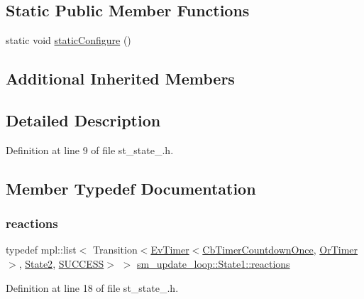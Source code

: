 \subsection*{Static Public Member Functions}
\begin{DoxyCompactItemize}
\item 
static void \hyperlink{structsm__update__loop_1_1State1_a54b1ae508eb3d814fb2d811d78298b0e}{static\+Configure} ()
\end{DoxyCompactItemize}
\subsection*{Additional Inherited Members}


\subsection{Detailed Description}


Definition at line 9 of file st\+\_\+state\+\_.\+h.



\subsection{Member Typedef Documentation}
\mbox{\label{structsm__update__loop_1_1State1_a828232579aa51d4fbfe9858c2a7016ad}} 
\subsubsection{\texorpdfstring{reactions}{reactions}}
{\footnotesize\ttfamily typedef mpl\+::list$<$ Transition$<$\hyperlink{structcl__ros__timer_1_1EvTimer}{Ev\+Timer}$<$\hyperlink{classcl__ros__timer_1_1CbTimerCountdownOnce}{Cb\+Timer\+Countdown\+Once}, \hyperlink{classsm__update__loop_1_1OrTimer}{Or\+Timer}$>$, \hyperlink{structsm__update__loop_1_1State2}{State2}, \hyperlink{structsmacc_1_1default__transition__tags_1_1SUCCESS}{S\+U\+C\+C\+E\+SS}$>$ $>$ \hyperlink{structsm__update__loop_1_1State1_a828232579aa51d4fbfe9858c2a7016ad}{sm\+\_\+update\+\_\+loop\+::\+State1\+::reactions}}



Definition at line 18 of file st\+\_\+state\+\_.\+h.



